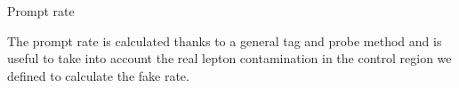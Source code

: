 \documentclass[handout,8 pt]{beamer}
\begin{document}
\begin{frame}{Prompt rate}

	\justifying
	The prompt rate is calculated thanks to a general tag and probe method and is useful to take into account the real lepton contamination in the control region we defined to calculate the fake rate. \vfill
	
	\hspace{4pt}
	\begin{minipage}[c]{.02\linewidth}
	\begin{exampleblock}{}  \end{exampleblock}
   \end{minipage}
	\begin{minipage}[c]{.48\linewidth}
   \end{minipage} \hfill
   \begin{minipage}[c]{.48\linewidth}
   \end{minipage} \hfill
   

\end{frame}
\end{document}
